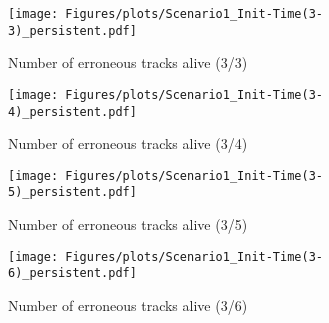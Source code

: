 \begin{figure}
\centering
\texttt{[image: Figures/plots/Scenario1\_Init-Time(3-3)\_persistent.pdf]}
\caption{Number of erroneous tracks alive (3/3)}\label{fig:init_time_3-3_persistent}

\texttt{[image: Figures/plots/Scenario1\_Init-Time(3-4)\_persistent.pdf]}
\caption{Number of erroneous tracks alive (3/4)}\label{fig:init_time_3-4_persistent}
\end{figure}

\begin{figure}
\centering
\texttt{[image: Figures/plots/Scenario1\_Init-Time(3-5)\_persistent.pdf]}
\caption{Number of erroneous tracks alive (3/5)}\label{fig:init_time_3-5_persistent}

\texttt{[image: Figures/plots/Scenario1\_Init-Time(3-6)\_persistent.pdf]}
\caption{Number of erroneous tracks alive (3/6)}\label{fig:init_time_3-6_persistent}
\end{figure}